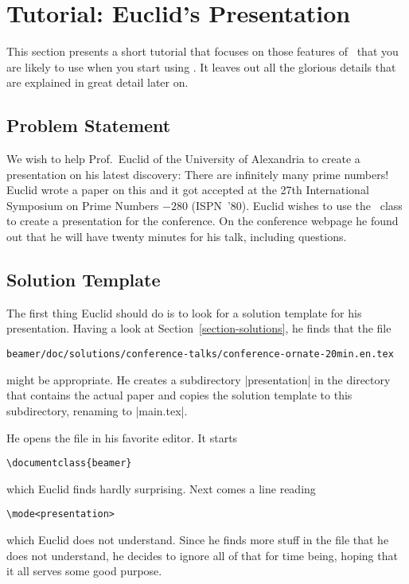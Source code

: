 %
%
%

\section{Tutorial: Euclid's Presentation}
\label{section-tutorial}

This section presents a short tutorial that focuses on those features of \beamer\ that you are likely to use when you start using \beamer. It  leaves out all the glorious details that are explained in great detail later on.


\subsection{Problem Statement}

We wish to help Prof.\ Euclid of the University of Alexandria to create a presentation on his latest discovery: There are infinitely many prime numbers! Euclid wrote a paper on this and it got accepted at the 27th International Symposium on Prime Numbers $-280$ (ISPN~'80). Euclid wishes to use the \beamer\ class to create a presentation for the conference. On the conference webpage he found out that he will have twenty minutes for his talk, including questions.


\subsection{Solution Template}

The first thing Euclid should do is to look for a solution template for his presentation. Having a look at Section~\ref{section-solutions}, he finds that the file
\begin{verbatim}
beamer/doc/solutions/conference-talks/conference-ornate-20min.en.tex
\end{verbatim}
might be appropriate. He creates a subdirectory |presentation| in the directory that contains the actual paper and copies the solution template to this subdirectory, renaming to |main.tex|.

He opens the file in his favorite editor. It starts
\begin{verbatim}
\documentclass{beamer}
\end{verbatim}
which Euclid finds hardly surprising. Next comes a line reading
\begin{verbatim}
\mode<presentation>
\end{verbatim}
which Euclid does not understand. Since he finds more stuff in the file that he does not understand, he decides to ignore all of that for time being, hoping that it all serves some good purpose.


